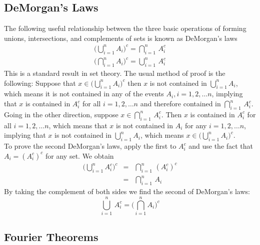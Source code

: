 \subsection{DeMorgan's Laws} The following useful relationship between the three basic operations of forming unions, intersections, and complements of sets is known as {\elevenit DeMorgan's laws}\/
\label{sec:DeMorgan}
\begin{eqnarray*}
\Big(\bigcup\limits_{i=1}^n A_i  \Big)^c   =  \bigcap\limits_{i=1}^n\, A_i^c \\
\Big(\bigcap\limits_{i=1}^n A_i  \Big)^c   =  \bigcup\limits_{i=1}^n\, A_i^c
\end{eqnarray*} This is a standard result in set theory. The usual method of proof is the following:
Suppose that $x \in \big(\bigcup\limits_{i=1}^n A_i  \big)^c$ then $x$ is not contained in  $\bigcup\limits_{i=1}^n A_i$, which means it is not contained in any of the events $A_i, i = 1,2, \hdots n$, implying that $x$ is contained in $A_i^c$ for all $i=1,2,\hdots n$ and therefore contained in  $\bigcap\limits_{i=1}^n\, A_i^c$. Going in the other direction, suppose $x\in  \bigcap\limits_{i=1}^n\, A_i^c$. Then $x$ is contained in $A_i^c$ for all $i=1,2,\hdots n$, which means that $x$ is not contained in $A_i$ for any $i=1,2,\hdots n$, implying that $x$ is not contained in $\bigcup\limits_{i=1}^n A_i $, which means $x \in \big(\bigcup\limits_{i=1}^n A_i  \big)^c$.\\

To prove the second DeMorgan's laws, apply the first to $A_i^c$ and use the fact that $A_i = (A_i^c)^c$ for any set. We obtain 
\begin{eqnarray*} 
\Big(\bigcup\limits_{i=1}^n A_i^c  \Big)^c  &=&  \bigcap\limits_{i=1}^n\, (A_i^c)^c \\
                                                   &=&  \bigcap\limits_{i=1}^n\, A_i 
\end{eqnarray*} By taking the complement of both sides we find the second of DeMorgan's laws:
$$\bigcup\limits_{i=1}^n\, A_i^c = \Big(\bigcap\limits_{i=1}^n A_i  \Big)^c $$ 

\subsection{Fourier Theorems}
\label{sec:Fourier}

